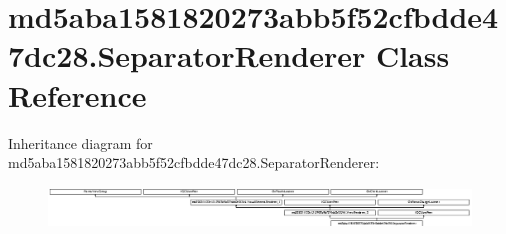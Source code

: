 \hypertarget{classmd5aba1581820273abb5f52cfbdde47dc28_1_1SeparatorRenderer}{}\section{md5aba1581820273abb5f52cfbdde47dc28.\+Separator\+Renderer Class Reference}
\label{classmd5aba1581820273abb5f52cfbdde47dc28_1_1SeparatorRenderer}
Inheritance diagram for md5aba1581820273abb5f52cfbdde47dc28.\+Separator\+Renderer\+:\begin{figure}[H]
\begin{center}
\leavevmode
\includegraphics[height=1.098039cm]{classmd5aba1581820273abb5f52cfbdde47dc28_1_1SeparatorRenderer}
\end{center}
\end{figure}
